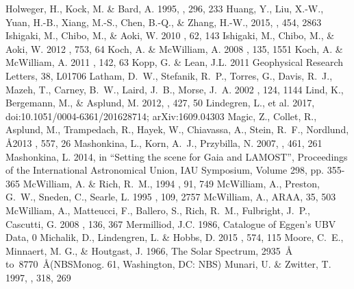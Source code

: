 \documentclass[revtex4]{emulateapj}
\begin{document}
\begin{thebibliography}{1}
 Holweger, H., Kock, M. \& Bard, A. 1995, \aap, 296, 233
 Huang, Y., Liu, X.-W., Yuan, H.-B., Xiang, M.-S., Chen, B.-Q., \& Zhang, H.-W., 2015, \mnras, 454, 2863 
 Ishigaki, M., Chibo, M., \& Aoki, W. 2010 \pasj, 62, 143
 Ishigaki, M., Chibo, M., \& Aoki, W. 2012 \apj, 753, 64
 Koch, A. \& McWilliam, A. 2008 \aj, 135, 1551
 Koch, A. \& McWilliam, A. 2011 \aj, 142, 63
 Kopp, G. \& Lean, J.L. 2011 Geophysical Research Letters, 38, L01706
 Latham, D.~W., Stefanik, R.~P., Torres, G., Davis, R.~J., Mazeh, T., Carney, B.~W., Laird, J.~B., Morse, J.~A. 2002 \aj, 124, 1144
 Lind, K., Bergemann, M., \& Asplund, M. 2012, \mnras, 427, 50
 Lindegren, L., et al. 2017, doi:10.1051/0004-6361/201628714; arXiv:1609.04303
 Magic, Z., Collet, R., Asplund, M., Trampedach, R., Hayek, W., Chiavassa, A., Stein, R.~F., Nordlund, \AA 2013 \aap, 557, 26
 Mashonkina, L., Korn, A.~J., Przybilla, N. 2007, \aap, 461, 261
 Mashonkina, L. 2014, in ``Setting the scene for Gaia and LAMOST'', Proceedings of the International Astronomical Union, IAU Symposium, Volume 298, pp. 355-365
 McWilliam, A. \& Rich, R.~M., 1994 \apjs, 91, 749
 McWilliam, A., Preston, G.~W., Sneden, C., Searle, L. 1995 \aj, 109, 2757
 McWilliam, A., ARAA, 35, 503
McWilliam, A., Matteucci, F., Ballero, S., Rich, R.~M., Fulbright, J.~P., Cascutti, G. 2008 \aj, 136, 367
 Mermilliod, J.C. 1986, Catalogue of Eggen's UBV Data, 0
 Michalik, D., Lindengren, L. \& Hobbs, D. 2015 \aap, 574, 115
 Moore, C.~E., Minnaert, M. G., \& Houtgast, J. 1966, The Solar Spectrum, 2935~\AA~ to~8770~\AA (NBSMonog. 61, Washington, DC: NBS)
 Munari, U. \& Zwitter, T. 1997, \aap, 318, 269

\end{thebibliography}
\end{document}

